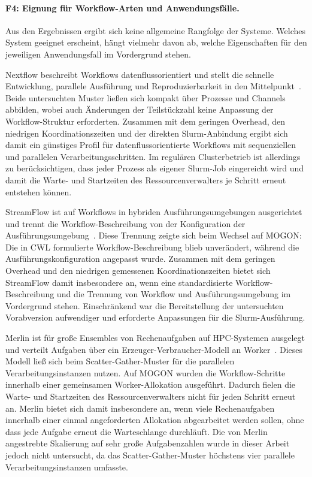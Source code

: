 \paragraph{F4: Eignung für Workflow-Arten und Anwendungsfälle.}
Aus den Ergebnissen ergibt sich keine allgemeine Rangfolge der
Systeme. Welches System geeignet erscheint, hängt vielmehr davon
ab, welche Eigenschaften für den jeweiligen Anwendungsfall im
Vordergrund stehen.

Nextflow beschreibt Workflows datenflussorientiert und stellt die
schnelle Entwicklung, parallele Ausführung und Reproduzierbarkeit
in den Mittelpunkt~\cite{ditommaso2017nextflow}. Beide untersuchten
Muster ließen sich kompakt über Prozesse und Channels abbilden, wobei
auch Änderungen der Teilstückzahl keine Anpassung der
Workflow-Struktur erforderten. Zusammen mit dem geringen Overhead,
den niedrigen Koordinationszeiten und der direkten Slurm-Anbindung
ergibt sich damit ein günstiges Profil für datenflussorientierte
Workflows mit sequenziellen und parallelen Verarbeitungsschritten.
Im regulären Clusterbetrieb ist allerdings zu berücksichtigen, dass
jeder Prozess als eigener Slurm-Job eingereicht wird und damit die
Warte- und Startzeiten des Ressourcenverwalters je Schritt erneut
entstehen können.

StreamFlow ist auf Workflows in hybriden Ausführungsumgebungen
ausgerichtet und trennt die Workflow-Beschreibung von der
Konfiguration der
Ausführungsumgebung~\cite{colonnelli2021streamflow}. Diese Trennung
zeigte sich beim Wechsel auf MOGON: Die in CWL formulierte
Workflow-Beschreibung blieb unverändert, während die
Ausführungskonfiguration angepasst wurde. Zusammen mit dem geringen Overhead und den niedrigen gemessenen Koordinationszeiten bietet sich StreamFlow
damit insbesondere an, wenn eine standardisierte
Workflow-Beschreibung und die Trennung von Workflow und
Ausführungsumgebung im Vordergrund stehen. Einschränkend war die
Bereitstellung der untersuchten Vorabversion aufwendiger und
erforderte Anpassungen für die Slurm-Ausführung.

\begin{sloppypar}
Merlin ist für große Ensembles von Rechenaufgaben auf HPC-Systemen
ausgelegt und verteilt Aufgaben über ein
Erzeuger-Verbraucher-Modell an
Worker~\cite{peterson2022merlin}. Dieses Modell ließ sich beim
Scatter-Gather-Muster für die parallelen Verarbeitungsinstanzen
nutzen. Auf MOGON wurden die Workflow-Schritte innerhalb einer
gemeinsamen Worker-Allokation ausgeführt. Dadurch fielen die
Warte- und Startzeiten des Ressourcenverwalters nicht für jeden
Schritt erneut an. Merlin bietet sich damit insbesondere an, wenn viele Rechenaufgaben innerhalb einer einmal angeforderten Allokation abgearbeitet werden
sollen, ohne dass jede Aufgabe erneut die Warteschlange durchläuft. Die von Merlin
angestrebte Skalierung auf sehr große Aufgabenzahlen wurde in
dieser Arbeit jedoch nicht untersucht, da das
Scatter-Gather-Muster höchstens vier parallele
Verarbeitungsinstanzen umfasste.
\end{sloppypar}

